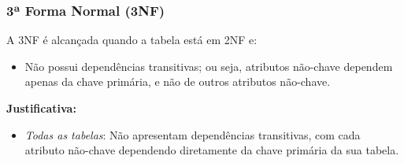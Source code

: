\documentclass{article}
\begin{document}
\subsubsection{3ª Forma Normal (3NF)}
A 3NF é alcançada quando a tabela está em 2NF e:
\begin{itemize}
    \item Não possui dependências transitivas; ou seja, atributos não-chave dependem apenas da chave primária, e não de outros atributos não-chave.
\end{itemize}

\textbf{Justificativa:}
\begin{itemize}
    \item \textit{Todas as tabelas}: Não apresentam dependências transitivas, com cada atributo não-chave dependendo diretamente da chave primária da sua tabela.
\end{itemize}


    
\end{document}
